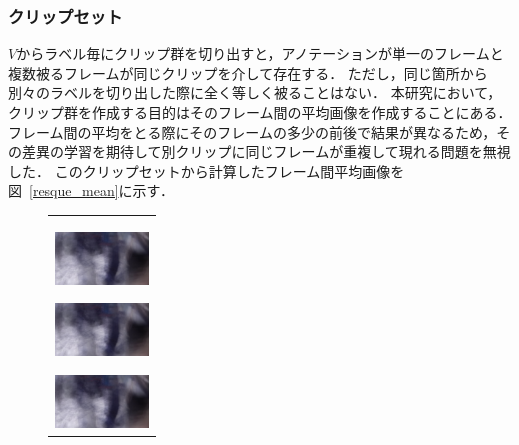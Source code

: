\subsubsection{クリップセット}
$V$からラベル毎にクリップ群を切り出すと，アノテーションが単一のフレームと複数被るフレームが同じクリップを介して存在する．
ただし，同じ箇所から別々のラベルを切り出した際に全く等しく被ることはない．
本研究において，クリップ群を作成する目的はそのフレーム間の平均画像を作成することにある．
フレーム間の平均をとる際にそのフレームの多少の前後で結果が異なるため，その差異の学習を期待して別クリップに同じフレームが重複して現れる問題を無視した．
このクリップセットから計算したフレーム間平均画像を図~\ref{resque_mean}に示す．


\begin{figure}[htbp]
  \begin{center}
    \begin{tabular}{c}
      \begin{minipage}{0.18\hsize}
        \begin{center}
          \includegraphics[clip, width=2.5cm]{./Figures/resque_mean1.eps}
          \hspace{0.3cm} { }
        \end{center}
      \end{minipage}
      \begin{minipage}{0.18\hsize}
        \begin{center}
          \includegraphics[clip, width=2.5cm]{./Figures/resque_mean1.eps}
          \hspace{0.3cm} { }
        \end{center}
      \end{minipage}
      \begin{minipage}{0.18\hsize}
        \begin{center}
          \includegraphics[clip, width=2.5cm]{./Figures/resque_mean1.eps}
          \hspace{2.0cm} {}

\end{center}
\end{minipage}
\end{tabular}
\end{center}
\end{figure}
